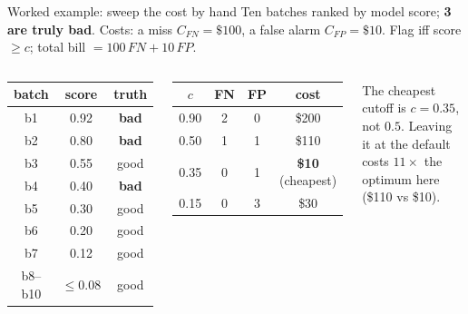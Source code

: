\documentclass[aspectratio=169]{beamer}
\begin{document}
\begin{frame}{Worked example: sweep the cost by hand}
  Ten batches ranked by model score; \textbf{3 are truly bad}. Costs: a miss $C_{FN}=\$100$, a
  false alarm $C_{FP}=\$10$. Flag iff score $\ge c$; total bill $= 100\,FN + 10\,FP$.
  \vfill
  \begin{columns}[T]
    \begin{center}\scriptsize
      \renewcommand{\arraystretch}{1.05}
      \begin{tabular}{c c c}
        batch & score & truth \\ \hline
        b1 & 0.92 & \textbf{bad} \\
        b2 & 0.80 & \textbf{bad} \\
        b3 & 0.55 & good \\
        b4 & 0.40 & \textbf{bad} \\
        b5 & 0.30 & good \\
        b6 & 0.20 & good \\
        b7 & 0.12 & good \\
        b8--b10 & $\le 0.08$ & good \\
      \end{tabular}
    \end{center}
    \begin{center}\small
      \renewcommand{\arraystretch}{1.35}
      \begin{tabular}{c c c c}
        $c$ & FN & FP & \textbf{cost} \\ \hline
        0.90 & 2 & 0 & \$200 \\
        0.50 & 1 & 1 & \$110 \\
        0.35 & 0 & 1 & \textbf{\$10} \;(cheapest) \\
        0.15 & 0 & 3 & \$30 \\
      \end{tabular}
    \end{center}
    \vskip 4pt
    \footnotesize The cheapest cutoff is \textbf{$c = 0.35$}, not $0.5$. Leaving it at the default
    costs \textbf{$11\times$} the optimum here (\$110 vs \$10).
  \end{columns}
\end{frame}
\end{document}
